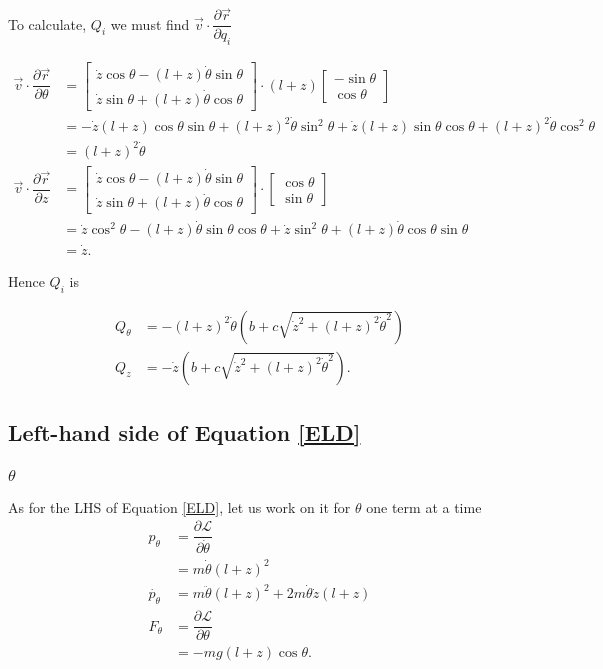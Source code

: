 \documentclass[12pt,a4paper,portrait]{article}
\newcommand{\lag}{\mathcal{L}}
\newcommand{\eq}[1]{Equation \eqref{#1}}
\begin{document}
To calculate, $Q_i$ we must find $\vec{v} \cdot \dfrac{\partial \vec{r}}{\partial q_i}$

\begin{align*}
	\vec{v} \cdot \dfrac{\partial \vec{r}}{\partial \theta} &= \begin{bmatrix}
		\dot{z}\cos{\theta} - (l+z)\dot{\theta}\sin{\theta} \\
		\dot{z}\sin{\theta} + (l+z)\dot{\theta}\cos{\theta}
	\end{bmatrix} \cdot (l+z)\begin{bmatrix}
		-\sin{\theta} \\
		\cos{\theta}
	\end{bmatrix} \\
	&= -\dot{z}(l+z)\cos{\theta} \sin{\theta} + (l+z)^2 \dot{\theta}\sin^2{\theta} + \dot{z}(l+z)\sin{\theta} \cos{\theta} +(l+z)^2\dot{\theta}\cos^2{\theta} \\
	&= (l+z)^2 \dot{\theta} \\
	\vec{v} \cdot \dfrac{\partial \vec{r}}{\partial z} &= \begin{bmatrix}
		\dot{z}\cos{\theta} - (l+z)\dot{\theta}\sin{\theta} \\
		\dot{z}\sin{\theta} + (l+z)\dot{\theta}\cos{\theta}
	\end{bmatrix} \cdot \begin{bmatrix}
		\cos{\theta} \\
		\sin{\theta}
	\end{bmatrix} \\
	&= \dot{z}\cos^2{\theta} - (l+z)\dot{\theta} \sin{\theta}\cos{\theta} + \dot{z}\sin^2{\theta} + (l+z)\dot{\theta}\cos{\theta}\sin{\theta} \\
	&= \dot{z}. 
\end{align*}

Hence $Q_i$ is

\begin{align*}
	Q_{\theta} &= -(l+z)^2 \dot{\theta} \left(b+c\sqrt{\dot{z}^2+(l+z)^2\dot{\theta}^2}\right) \\
	Q_z &= -\dot{z}\left(b+c\sqrt{\dot{z}^2+(l+z)^2\dot{\theta}^2}\right).
\end{align*}

\subsection{Left-hand side of \eq{ELD}}
\subsubsection{$\theta$}
As for the LHS of \eq{ELD}, let us work on it for $\theta$ one term at a time
\begin{align*}
	p_{\theta} &= \dfrac{\partial \lag}{\partial \dot{\theta}} \\
	&= m\dot{\theta}(l+z)^2 \\
	\dot{p_{\theta}} &= m\ddot{\theta} (l+z)^2 + 2m\dot{\theta}\dot{z}(l+z) \\
	F_{\theta} &= \dfrac{\partial \lag}{\partial \theta} \\
	&= -mg(l+z)\cos{\theta}.
\end{align*}
\end{document}
